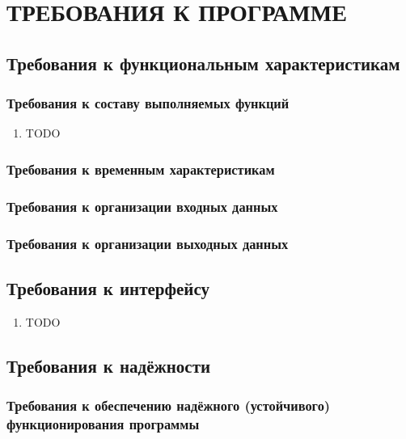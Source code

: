 \section{ТРЕБОВАНИЯ К ПРОГРАММЕ}

\subsection{Требования к функциональным характеристикам}
\label{requirements.features}
    \subsubsection{Требования к составу выполняемых функций}
        \begin{enumerate}[series=requirements]
        	\item TODO
        \end{enumerate}

    \subsubsection{Требования к временным характеристикам}

    \subsubsection{Требования к организации входных данных}
    
    \subsubsection{Требования к организации выходных данных}

\subsection{Требования к интерфейсу}
\label{requirements.interface}
    \begin{enumerate}
    	\item TODO
    \end{enumerate}

\subsection{Требования к надёжности}
\label{requirements.quality}
    \subsubsection{Требования к обеспечению надёжного (устойчивого) функционирования программы}

